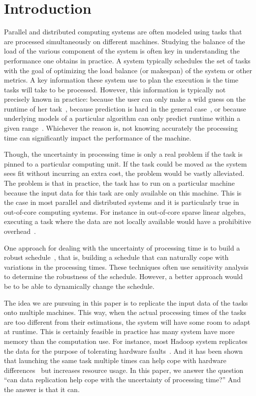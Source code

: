 \documentclass[10pt, conference, compsocconf]{IEEEtran}
\begin{document}
\IEEEpeerreviewmaketitle

\section{Introduction}

Parallel and distributed computing systems are often modeled using
tasks that are processed simultaneously on different
machines. Studying the balance of the load of the various component of
the system is often key in understanding the performance one obtains
in practice. A system typically schedules the set of tasks with the
goal of optimizing the load balance (or makespan) of the system or
other metrics. A key information these system use to plan the
execution is the time tasks will take to be processed. However, this
information is typically not precisely known in practice: because the
user can only make a wild guess on the runtime of her
task~\cite{Luong2008}, because prediction is hard in the general
case~\cite{Wilhelm2008}, or because underlying models of a particular
algorithm can only predict runtime within a given
range~\cite{Erlebacher14-ICS}. Whichever the reason is, not knowing
accurately the processing time can significantly impact the
performance of the machine.

Though, the uncertainty in processing time is only a real problem if
the task is pinned to a particular computing unit. If the task could
be moved as the system sees fit without incurring an extra cost, the
problem would be vastly alleviated. The problem is that in practice,
the task has to run on a particular machine because the input data for
this task are only available on this machine. This is the case in most
parallel and distributed systems and it is particularly true in
out-of-core computing systems. For instance in out-of-core sparse
linear algebra, executing a task where the data are not locally
available would have a prohibitive
overhead~\cite{Zhou12-Cluster,Zhou12-P2S2}.

One approach for dealing with the uncertainty of processing time is to
build a robust schedule~\cite{cj09c,Gatto07,
  Davenport_slack-basedtechniques}, that is, building a schedule that
can naturally cope with variations in the processing times. These
techniques often use sensitivity analysis to determine the robustness
of the schedule. However, a better approach would be to be able to
dynamically change the schedule. 

The idea we are pursuing in this paper is to replicate the input data
of the tasks onto multiple machines. This way, when the actual
processing times of the tasks are too different from their
estimations, the system will have some room to adapt at runtime. This
is certainly feasible in practice has many system have more memory
than the computation use. For instance, most Hadoop system replicates
the data for the purpose of tolerating hardware
faults~\cite{White:2009:HDG:1717298}. And it has been shown that
launching the same task multiple times can help cope with hardware
differences~\cite{DBLP:journals/corr/WangJW14} but increases resource
usage. In this paper, we answer the question ``can data replication
help cope with the uncertainty of processing time?'' And the answer is
that it can.
\end{document}
